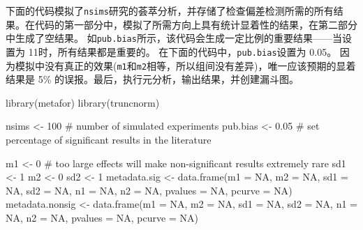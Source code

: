 \documentclass[
  letterpaper,
  DIV=11,
  numbers=noendperiod]{scrreprt}
\newenvironment{Shaded}{\begin{snugshade}}{\end{snugshade}}
\newcommand{\AttributeTok}[1]{\textcolor[rgb]{0.40,0.45,0.13}{#1}}
\newcommand{\CommentTok}[1]{\textcolor[rgb]{0.37,0.37,0.37}{#1}}
\newcommand{\ConstantTok}[1]{\textcolor[rgb]{0.56,0.35,0.01}{#1}}
\newcommand{\DecValTok}[1]{\textcolor[rgb]{0.68,0.00,0.00}{#1}}
\newcommand{\FloatTok}[1]{\textcolor[rgb]{0.68,0.00,0.00}{#1}}
\newcommand{\FunctionTok}[1]{\textcolor[rgb]{0.28,0.35,0.67}{#1}}
\newcommand{\NormalTok}[1]{\textcolor[rgb]{0.00,0.23,0.31}{#1}}
\newcommand{\OtherTok}[1]{\textcolor[rgb]{0.00,0.23,0.31}{#1}}
\begin{document}
下面的代码模拟了\texttt{nsims}研究的荟萃分析，并存储了检查偏差检测所需的所有结果。在代码的第一部分中，模拟了所需方向上具有统计显着性的结果，在第二部分中生成了空结果。
如\texttt{pub.bias}所示，该代码会生成一定比例的重要结果------当设置为
11时，所有结果都是重要的。 在下面的代码中，\texttt{pub.bias}设置为
0.05。
因为模拟中没有真正的效果(\texttt{m1}和\texttt{m2}相等，所以组间没有差异)，唯一应该预期的显着结果是
5\% 的误报。最后，执行元分析，输出结果，并创建漏斗图。

\begin{Shaded}
\begin{Highlighting}[]
\FunctionTok{library}\NormalTok{(metafor)}
\FunctionTok{library}\NormalTok{(truncnorm)}

\NormalTok{nsims }\OtherTok{\textless{}{-}} \DecValTok{100} \CommentTok{\# number of simulated experiments}
\NormalTok{pub.bias }\OtherTok{\textless{}{-}} \FloatTok{0.05} \CommentTok{\# set percentage of significant results in the literature}

\NormalTok{m1 }\OtherTok{\textless{}{-}} \DecValTok{0} \CommentTok{\# too large effects will make non{-}significant results extremely rare}
\NormalTok{sd1 }\OtherTok{\textless{}{-}} \DecValTok{1}
\NormalTok{m2 }\OtherTok{\textless{}{-}} \DecValTok{0}
\NormalTok{sd2 }\OtherTok{\textless{}{-}} \DecValTok{1}
\NormalTok{metadata.sig }\OtherTok{\textless{}{-}} \FunctionTok{data.frame}\NormalTok{(}\AttributeTok{m1 =} \ConstantTok{NA}\NormalTok{, }\AttributeTok{m2 =} \ConstantTok{NA}\NormalTok{, }\AttributeTok{sd1 =} \ConstantTok{NA}\NormalTok{, }\AttributeTok{sd2 =} \ConstantTok{NA}\NormalTok{, }
                           \AttributeTok{n1 =} \ConstantTok{NA}\NormalTok{, }\AttributeTok{n2 =} \ConstantTok{NA}\NormalTok{, }\AttributeTok{pvalues =} \ConstantTok{NA}\NormalTok{, }\AttributeTok{pcurve =} \ConstantTok{NA}\NormalTok{)}
\NormalTok{metadata.nonsig }\OtherTok{\textless{}{-}} \FunctionTok{data.frame}\NormalTok{(}\AttributeTok{m1 =} \ConstantTok{NA}\NormalTok{, }\AttributeTok{m2 =} \ConstantTok{NA}\NormalTok{, }\AttributeTok{sd1 =} \ConstantTok{NA}\NormalTok{, }\AttributeTok{sd2 =} \ConstantTok{NA}\NormalTok{, }
                              \AttributeTok{n1 =} \ConstantTok{NA}\NormalTok{, }\AttributeTok{n2 =} \ConstantTok{NA}\NormalTok{, }\AttributeTok{pvalues =} \ConstantTok{NA}\NormalTok{, }\AttributeTok{pcurve =} \ConstantTok{NA}\NormalTok{)}


\end{Highlighting}
\end{Shaded}
\end{document}
